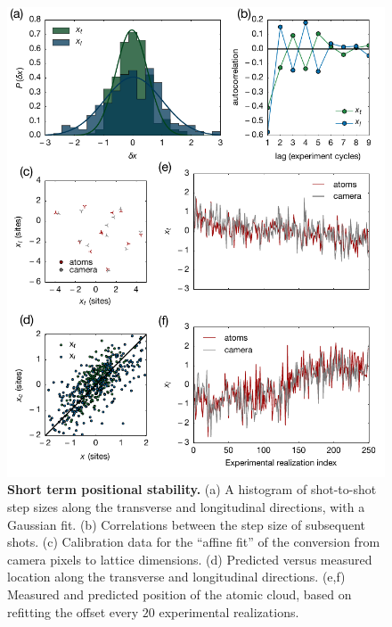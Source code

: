 \documentclass[twocolumn,aps,pra,showpacs,preprintnumbers,bibnotes]{revtex4-1}
\begin{document}
\begin{figure}
  \begin{center}
    \includegraphics[width=\columnwidth]{Figure13.pdf}
    \caption{\textbf{Short term positional stability.} (a) A histogram of shot-to-shot step sizes along the transverse and longitudinal directions, with a Gaussian fit. (b) Correlations between the step size of subsequent shots. (c) Calibration data for the ``affine fit'' of the conversion from camera pixels to lattice dimensions. (d) Predicted versus measured location along the transverse and longitudinal directions. (e,f) Measured  and predicted position of the atomic cloud, based on refitting the offset every $20$ experimental realizations.}\label{fig:stability}
  \end{center}
\end{figure}
\end{document}
